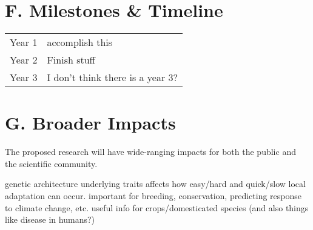 \section*{F. Milestones \& Timeline}
\begin{tabular}{ll}
Year 1 \hspace{0.5in} & accomplish this\\
Year 2                     & Finish stuff  \\
Year 3		& I don't think there is a year 3?\\
\end{tabular}

\section*{G. Broader Impacts}

The proposed research will have wide-ranging impacts for both the public and the scientific community.


genetic architecture underlying traits affects how easy/hard and quick/slow local adaptation can occur. important for breeding, conservation, predicting response to climate change, etc.
useful info for crops/domesticated species (and also things like disease in humans?)

